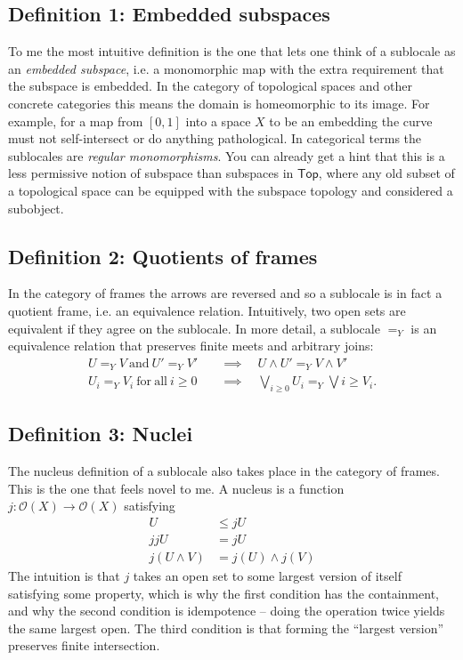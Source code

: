 \documentclass[12pt]{extarticle}
\newcommand{\Topcat}{\ensuremath{\mathsf{Top}}}
\renewcommand{\o}{\ensuremath{\mathcal{O}}}
\begin{document}
\subsection{Definition 1: Embedded subspaces}
To me the most intuitive definition is the one that lets one think of a sublocale as an \emph{embedded subspace}, i.e. a monomorphic map with the extra requirement that the subspace is embedded. In the category of topological spaces and other concrete categories this means the domain is homeomorphic to its image. For example, for a map from $[0,1]$ into a space $X$ to be an embedding the curve must not self-intersect or do anything pathological. In categorical terms the sublocales are \emph{regular monomorphisms}. You can already get a hint that this is a less permissive notion of subspace than subspaces in \Topcat, where any old subset of a topological space can be equipped with the subspace topology and considered a subobject.

\subsection{Definition 2: Quotients of frames}
In the category of frames the arrows are reversed and so a sublocale is in fact a quotient frame, i.e. an equivalence relation. Intuitively, two open sets are equivalent if they agree on the sublocale. In more detail, a sublocale $=_Y$ is an equivalence relation that preserves finite meets and arbitrary joins:
\begin{align}
U=_Y V\mathrm{\ and\ }U'=_Y V'&\quad\implies\quad U\wedge U'=_Y V\wedge V' \\
U_i=_Y V_i\mathrm{\ for\ all\ } i\geq 0&\quad\implies\quad \bigvee_{i\geq 0}U_i =_Y \bigvee{i\geq } V_i.
\end{align}

\subsection{Definition 3: Nuclei}
The nucleus definition of a sublocale also takes place in the category of frames. This is the one that feels novel to me. A nucleus is a function $j:\o(X)\to\o(X)$ satisfying
\begin{align}
U&\leq jU \\
jjU &= jU \\
j(U\wedge V)&=j(U)\wedge j(V)
\end{align}
The intuition is that $j$ takes an open set to some largest version of itself satisfying some property, which is why the first condition has the containment, and why the second condition is idempotence -- doing the operation twice yields the same largest open. The third condition is that forming the ``largest version'' preserves finite intersection.
\end{document}
